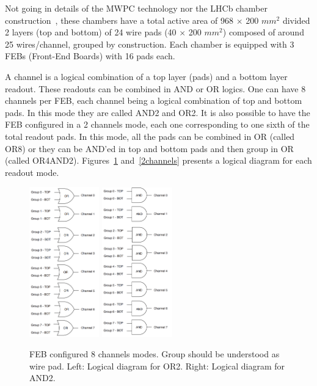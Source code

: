 Not going in details of the MWPC technology nor the LHCb chamber construction~\cite{lhcb_mwpc}, these chambers have a total active area of 968 $\times$ 200 $mm^2$ divided 2 layers (top and bottom) of 24 wire pads (40 $\times$ 200 $mm^2$) composed of around 25 wires/channel, grouped by construction. Each chamber is equipped with 3 FEBs (Front-End Boards) with 16 pads each.

A channel is a logical combination of a top layer (pads) and a bottom layer readout. These readouts can be combined in AND or OR logics. One can have 8 channels per FEB, each channel being a logical combination of top and bottom pads. In this mode they are called AND2 and OR2. It is also possible to have the FEB configured in a 2 channels mode, each one corresponding to one sixth of the total readout pads. In this mode, all the pads can be combined in OR (called OR8) or they can be AND'ed in top and bottom pads and then group in OR (called OR4AND2). Figures~\ref{8channels} and~\ref{2channels} presents a logical diagram for each readout mode.

\begin{figure}[!htbp]
\begin{center}
\includegraphics[width=0.27\textwidth,keepaspectratio]{figures/rpc/mwpc/or2.png}\hspace*{1.cm}
\includegraphics[width=0.27\textwidth,keepaspectratio]{figures/rpc/mwpc/and2.png}\hspace*{1.cm}
\end{center}\vspace*{-.5cm}
\caption{FEB configured 8 channels modes. Group should be understood as wire pad. Left: Logical diagram for OR2. Right: Logical diagram for AND2.}
\label{8channels}
\end{figure}


